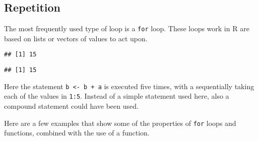 \documentclass[paper=a4,10pt,div=17,headsepline,BCOR=12mm,twoside,open=right]{scrbook}\usepackage{knitr}
\begin{document}
\subsection{Repetition}

The most frequently used type of loop is a \texttt{for} loop. These loops work in R are based on lists or vectors of values to act upon.

\begin{knitrout}\footnotesize
{}\color{fgcolor}\begin{kframe}
\begin{alltt}
 \hlkwb{<-} 
   \hlopt{:} \hlkwb{<-}  \hlopt{+} 
\end{alltt}
\begin{verbatim}
## [1] 15
\end{verbatim}
\begin{alltt}
 \hlkwb{<-} \hlstd{(}\hlopt{:}\hlstd{)} 
\end{alltt}
\begin{verbatim}
## [1] 15
\end{verbatim}
\end{kframe}
\end{knitrout}

Here the statement \texttt{b <- b + a} is executed five times, with a sequentially taking each of the values in \texttt{1:5}. Instead of a simple statement used here, also a compound statement could have been used.

Here are a few examples that show some of the properties of \texttt{for} loops and functions, combined with the use of a function.
\end{document}

